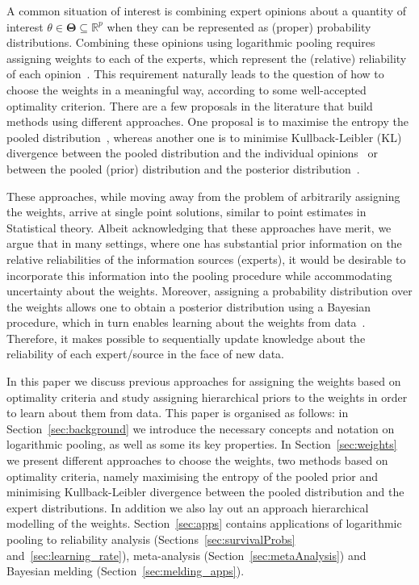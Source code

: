 \documentclass[a4paper, notitlepage, 10pt]{article}
\begin{document}
A common situation of interest is combining expert opinions about a quantity of interest $\theta \in \mathbf{\Theta} \subseteq \mathbb{R}^p$ when they can be represented as (proper) probability distributions.
Combining these opinions using logarithmic pooling requires assigning weights to each of the experts, which represent the (relative) reliability of each opinion~\citep{genest1984}.
This requirement naturally leads to the question of how to choose the weights in a meaningful way, according to some well-accepted optimality criterion.
There are a few proposals in the literature that build methods using different approaches.
One proposal is to maximise the entropy the pooled distribution~\citep{myung1996}, whereas another one is to minimise Kullback-Leibler (KL) divergence between the pooled distribution and the individual opinions~\citep{abbas2009} or between the pooled (prior) distribution and the posterior distribution~\citep{rufo2012A,rufo2012B}.

These approaches, while moving away from the problem of arbitrarily assigning the weights, arrive at single point solutions, similar to point estimates in Statistical theory.
Albeit acknowledging that these approaches have merit, we argue that in many settings, where one has substantial prior information on the relative reliabilities of the information sources (experts), it would be desirable to incorporate this information into the pooling procedure while accommodating uncertainty about the weights.
Moreover, assigning a probability distribution over the weights allows one to obtain a posterior distribution using a Bayesian procedure, which in turn enables learning about the weights from data~\citep{poole2000}.
Therefore, it makes possible to sequentially update knowledge about the reliability of each expert/source in the face of new data.

In this paper we discuss previous approaches for assigning the weights based on optimality criteria and study assigning hierarchical priors to the weights in order to learn about them from data.
This paper is organised as follows: in Section~\ref{sec:background} we introduce the necessary concepts and notation on logarithmic pooling, as well as some its key properties.
In Section~\ref{sec:weights} we present different approaches to choose the weights, two methods based on optimality criteria, namely maximising the entropy of the pooled prior and minimising Kullback-Leibler divergence between the pooled distribution and the expert distributions.
In addition we also lay out an approach hierarchical modelling of the weights.
Section~\ref{sec:apps} contains applications of logarithmic pooling to reliability analysis (Sections~\ref{sec:survivalProbs} and~\ref{sec:learning_rate}), meta-analysis (Section~\ref{sec:metaAnalysis}) and Bayesian melding (Section~\ref{sec:melding_apps}).
\end{document}
